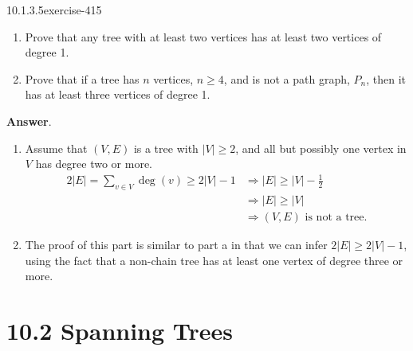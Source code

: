 \documentclass[twoside,10pt,]{book}
\numberwithin{equation}{section}
\begin{document}
\begin{divisionsolution}{10.1.3.5}{}{exercise-415}%
\hypertarget{p-3555}{}%
\leavevmode%
\begin{enumerate}[label=(\alph*)]
\item\hypertarget{li-1646}{}\hypertarget{p-3556}{}%
Prove that any tree with at least two vertices has at least two vertices of degree 1.%
\item\hypertarget{li-1647}{}\hypertarget{p-3557}{}%
Prove that if a tree has \(n\) vertices,  \(n \geq 4\), and is not a path graph, \(P_n\), then it has at least three vertices of degree 1.%
\end{enumerate}
%
\par\smallskip%
\noindent\textbf{Answer}.\quad%
\hypertarget{p-3558}{}%
\leavevmode%
\begin{enumerate}[label=(\alph*)]
\item\hypertarget{li-1648}{}\hypertarget{p-3559}{}%
Assume that \((V,E)\) is a tree with \(\left| V\right| \geq 2\), and all but possibly one vertex in \(V\) has degree two or more.%
\begin{equation*}
\begin{split}
2\lvert E \rvert =\sum_{v \in V}{\deg(v)} \geq 2 \lvert V \rvert -1 &\Rightarrow
\lvert E\vert  \geq \lvert V\rvert -\frac{1}{2}\\
&\Rightarrow \lvert E\rvert \geq \lvert V\rvert\\
& \Rightarrow (V,E) \textrm{ is not a tree.}
\end{split}
\end{equation*}
%
\item\hypertarget{li-1649}{}\hypertarget{p-3560}{}%
The proof of this part is similar to part a in that we can infer \(2\lvert E\rvert \geq 2 \lvert V\rvert -1\), using the fact that a non-chain tree has at least one vertex of degree three or more.%
\end{enumerate}
%
\end{divisionsolution}%
\section*{10.2 Spanning Trees}
\end{document}
